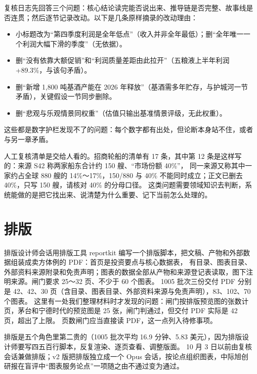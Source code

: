 \begin{story}
复核日志先回答三个问题：核心结论读完能否说出来、推导链是否完整、故事线是否连贯；然后逐节记录改动。以下是几条原样摘录的改动理由：

\begin{itemize}
  \item 小标题改为“第四季度利润是全年低点”（收入并非全年最低）；删“全年唯一一个利润大幅下滑的季度”（无依据）。
  \item 删“没有依靠大额促销”和“利润质量差距由此拉开”（五粮液上半年利润 +89.3\%，与该句矛盾）。
  \item 删“新增 1,800 吨基酒产能在 2026 年释放”（基酒需多年贮存，与护城河一节矛盾），关键假设一节同步删除。
  \item 删“悲观与乐观情景同权重”（估值只输出基准情景评级，无此权重）。
\end{itemize}

这些都是数字护栏发现不了的问题：每个数字都有出处，但论断本身站不住，或者与另一章矛盾。
\end{story}

人工复核清单是交给人看的。招商轮船的清单有 17 条，其中第 12 条是这样写的：来源 S42 称两家船东合计约 150 艘、“市场份额 40\%”，
同一来源又称其中一家约占全球 880 艘的 14\%～17\%，150/880 与 40\% 不能同时成立；正文已删去 40\%，只写 150 艘，请核对 40\% 的分母口径。
这类问题需要领域知识去判断，系统能做的是把它找出来、说清楚为什么重要、记下当前怎么处理的。

\section{排版}

排版设计师会话用排版工具 reportkit 编写一个排版脚本，把文稿、产物和外部数据组装成卖方体例的 PDF：首页是投资要点与核心数据表，
有目录、图表目录、外部资料来源附录和免责声明；图表的数据全部从产物和来源登记表读取，图下注明来源。闸门要求 25～32 页、不少于 60 个图表。
1005 批次三份交付 PDF 分别是 42、42、30 页（含目录、图表目录、外部资料来源与免责声明），83、102、70 个图表。
这里有一处我们整理材料时才发现的问题：闸门按排版预览图的张数计页，茅台和宁德时代的预览图是 25 张，闸门判通过，但交付 PDF 实际是 42 页，超出了上限。
页数闸门应当直接读 PDF，这一点列入待修事项。

排版是五个角色里第二贵的（1005 批次平均 16.9 分钟、5.83 美元），因为排版设计师要写四五百行脚本，反复渲染、逐页查看、调整版面。
10 月 3 日以前由复核会话兼做排版；v2 版把排版独立成一个 Opus 会话，按论点组织图表，中际旭创研报在盲评中“图表服务论点”一项随之由不通过变为通过。
